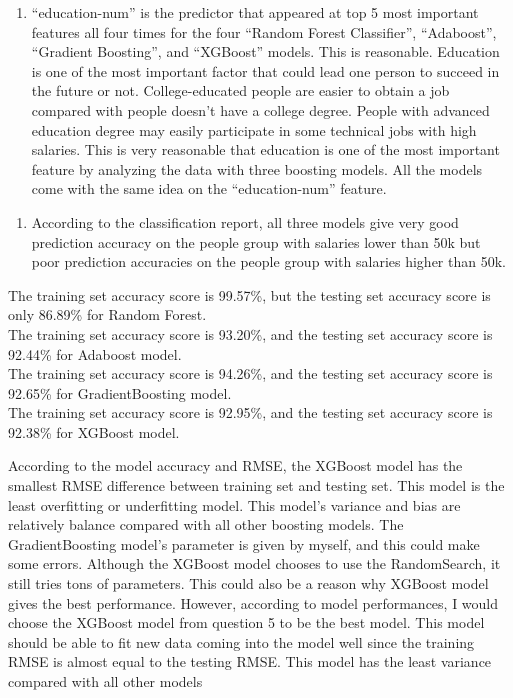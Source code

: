 \documentclass[11pt]{article}
\providecommand{\tightlist}{%
      \setlength{\itemsep}{0pt}\setlength{\parskip}{0pt}}
\begin{document}
    \begin{enumerate}
\def\labelenumi{\alph{enumi})}
\setcounter{enumi}{3}
\tightlist
\item
  ``education-num'' is the predictor that appeared at top 5 most
  important features all four times for the four ``Random Forest
  Classifier'', ``Adaboost'', ``Gradient Boosting'', and ``XGBoost''
  models. This is reasonable. Education is one of the most important
  factor that could lead one person to succeed in the future or not.
  College-educated people are easier to obtain a job compared with
  people doesn't have a college degree. People with advanced education
  degree may easily participate in some technical jobs with high
  salaries. This is very reasonable that education is one of the most
  important feature by analyzing the data with three boosting models.
  All the models come with the same idea on the ``education-num''
  feature.
\end{enumerate}

    \begin{enumerate}
\def\labelenumi{\alph{enumi})}
\setcounter{enumi}{4}
\tightlist
\item
  According to the classification report, all three models give very
  good prediction accuracy on the people group with salaries lower than
  50k but poor prediction accuracies on the people group with salaries
  higher than 50k.
\end{enumerate}

The training set accuracy score is 99.57\%, but the testing set accuracy
score is only 86.89\% for Random Forest.\\
The training set accuracy score is 93.20\%, and the testing set accuracy
score is 92.44\% for Adaboost model.\\
The training set accuracy score is 94.26\%, and the testing set accuracy
score is 92.65\% for GradientBoosting model.\\
The training set accuracy score is 92.95\%, and the testing set accuracy
score is 92.38\% for XGBoost model.

According to the model accuracy and RMSE, the XGBoost model has the
smallest RMSE difference between training set and testing set. This
model is the least overfitting or underfitting model. This model's
variance and bias are relatively balance compared with all other
boosting models. The GradientBoosting model's parameter is given by
myself, and this could make some errors. Although the XGBoost model
chooses to use the RandomSearch, it still tries tons of parameters. This
could also be a reason why XGBoost model gives the best performance.
However, according to model performances, I would choose the XGBoost
model from question 5 to be the best model. This model should be able to
fit new data coming into the model well since the training RMSE is
almost equal to the testing RMSE. This model has the least variance
compared with all other models
\end{document}
